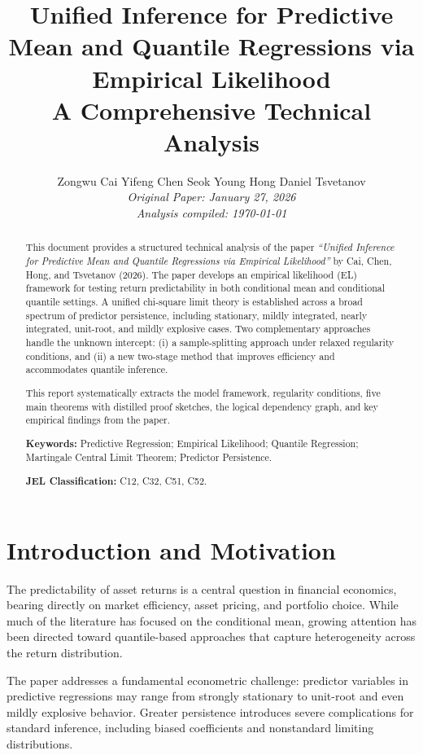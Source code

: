 \documentclass[11pt,a4paper]{article}
\title{\textbf{Unified Inference for Predictive Mean and Quantile Regressions via Empirical Likelihood}\\[4pt]
\large A Comprehensive Technical Analysis}
\author{%
    Zongwu Cai \quad Yifeng Chen \quad Seok Young Hong \quad Daniel Tsvetanov\\[4pt]
    \small\textit{Original Paper: January 27, 2026}\\[2pt]
    \small\textit{Analysis compiled: \today}
}
\date{}
\theoremstyle{definition}
\theoremstyle{remark}
\begin{document}
\maketitle

\begin{abstract}
\noindent This document provides a structured technical analysis of the paper
\textit{``Unified Inference for Predictive Mean and Quantile Regressions via Empirical Likelihood''}
by Cai, Chen, Hong, and Tsvetanov (2026).
The paper develops an empirical likelihood (EL) framework for testing return predictability
in both conditional mean and conditional quantile settings.
A unified chi-square limit theory is established across a broad spectrum of predictor persistence,
including stationary, mildly integrated, nearly integrated, unit-root, and mildly explosive cases.
Two complementary approaches handle the unknown intercept:
(i) a sample-splitting approach under relaxed regularity conditions, and
(ii) a new two-stage method that improves efficiency and accommodates quantile inference.

This report systematically extracts the model framework, regularity conditions,
five main theorems with distilled proof sketches, the logical dependency graph,
and key empirical findings from the paper.

\bigskip
\noindent\textbf{Keywords:} Predictive Regression; Empirical Likelihood; Quantile Regression;
Martingale Central Limit Theorem; Predictor Persistence.

\noindent\textbf{JEL Classification:} C12, C32, C51, C52.
\end{abstract}

\newpage
\tableofcontents
\newpage

\section{Introduction and Motivation}

The predictability of asset returns is a central question in financial economics,
bearing directly on market efficiency, asset pricing, and portfolio choice.
While much of the literature has focused on the conditional mean,
growing attention has been directed toward quantile-based approaches
that capture heterogeneity across the return distribution.

The paper addresses a fundamental econometric challenge:
predictor variables in predictive regressions may range from strongly stationary
to unit-root and even mildly explosive behavior.
Greater persistence introduces severe complications for standard inference,
including biased coefficients and nonstandard limiting distributions.
\end{document}
